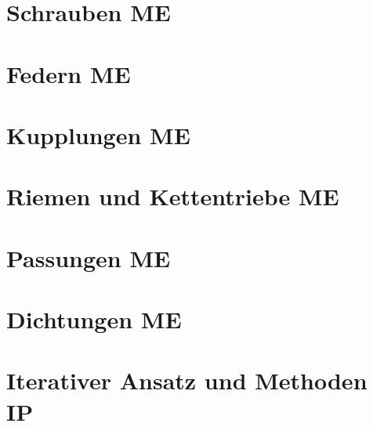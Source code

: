 \documentclass[numerate]{cheatsheet}
\begin{document}
\section{Schrauben \hfill ME}
    
    
    
    
    
    
    
    
    
    
    \cbreak
    
    

\section{Federn \hfill ME}
    
    
    
    
    
    
    \cbreak
    

\section{Kupplungen \hfill ME}
    
    

\section{Riemen und Kettentriebe \hfill ME}
    

\section{Passungen \hfill ME}
    

\section{Dichtungen \hfill ME}
    

\newpage

\section{Iterativer Ansatz und Methoden \hfill IP}
    
    
    
    
    
    \cbreak
    
    
    
    
\end{document}
